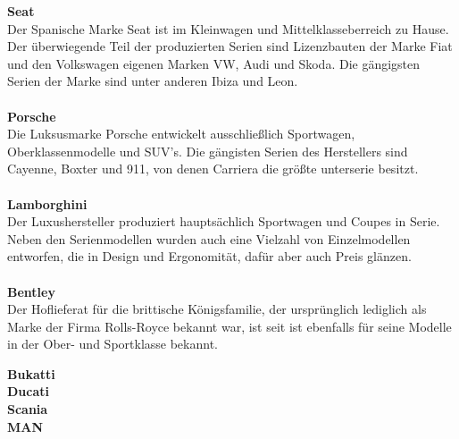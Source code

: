 \documentclass[12pt]{article}
\begin{document}
\newpage
\textbf{Seat}\\
Der Spanische Marke Seat ist im Kleinwagen und Mittelklasseberreich zu Hause. Der überwiegende Teil der produzierten Serien sind Lizenzbauten der Marke Fiat und den Volkswagen eigenen Marken VW, Audi und Skoda.
Die gängigsten Serien der Marke sind unter anderen Ibiza und Leon.\\
\\ 
\textbf{Porsche}\\
Die Luksusmarke Porsche entwickelt ausschließlich Sportwagen, Oberklassenmodelle und SUV's.
Die gängisten Serien des Herstellers sind Cayenne, Boxter und 911, von denen Carriera die größte unterserie besitzt.\\
\\
\textbf{Lamborghini}\\
Der Luxushersteller produziert hauptsächlich Sportwagen und Coupes in Serie. Neben den Serienmodellen wurden auch eine
Vielzahl von Einzelmodellen entworfen, die in Design und Ergonomität, dafür aber auch Preis glänzen.\\
\\
\textbf{Bentley}\\
Der Hoflieferat für die brittische Königsfamilie, der ursprünglich lediglich als Marke der Firma Rolls-Royce bekannt war, ist seit  ist ebenfalls für seine Modelle in der Ober- und Sportklasse bekannt.

\textbf{Bukatti}\\
\textbf{Ducati}\\
\textbf{Scania}\\
\textbf{MAN}


\newpage
\end{document}
